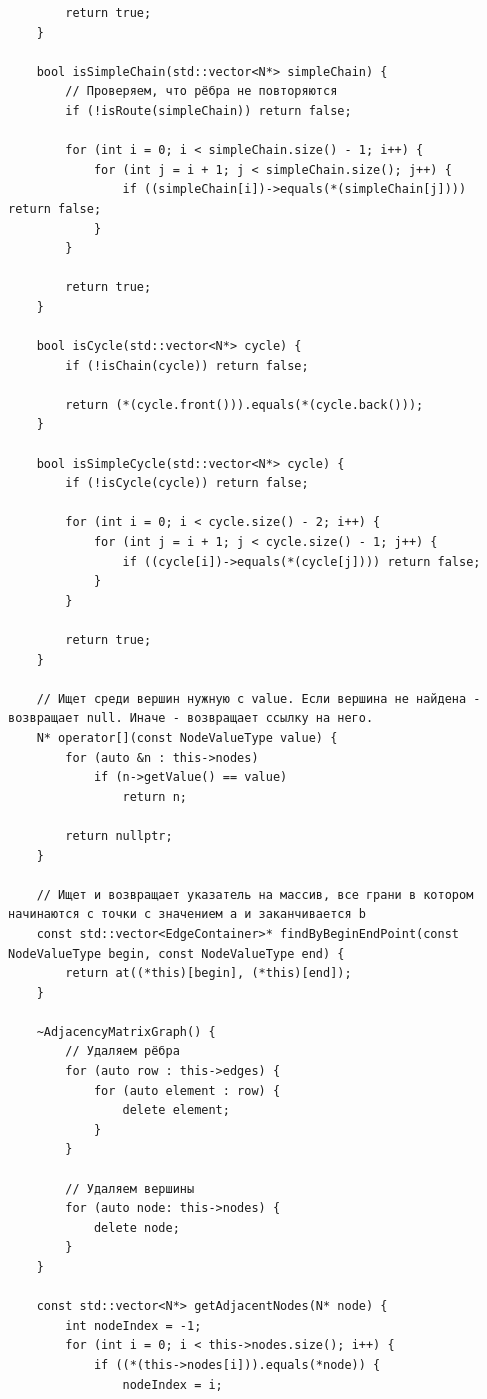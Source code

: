 \documentclass[a4paper,14pt]{extarticle}
\begin{document}
\begin{enumerate}[1.]
\begin{verbatim}
        return true;
    }

    bool isSimpleChain(std::vector<N*> simpleChain) {
        // Проверяем, что рёбра не повторяются
        if (!isRoute(simpleChain)) return false;

        for (int i = 0; i < simpleChain.size() - 1; i++) {
            for (int j = i + 1; j < simpleChain.size(); j++) {
                if ((simpleChain[i])->equals(*(simpleChain[j]))) return false;
            }
        }

        return true;
    }

    bool isCycle(std::vector<N*> cycle) {
        if (!isChain(cycle)) return false;

        return (*(cycle.front())).equals(*(cycle.back()));
    }

    bool isSimpleCycle(std::vector<N*> cycle) {
        if (!isCycle(cycle)) return false;

        for (int i = 0; i < cycle.size() - 2; i++) {
            for (int j = i + 1; j < cycle.size() - 1; j++) {
                if ((cycle[i])->equals(*(cycle[j]))) return false;
            }
        }

        return true;
    }

    // Ищет среди вершин нужную с value. Если вершина не найдена - возвращает null. Иначе - возвращает ссылку на него. 
    N* operator[](const NodeValueType value) {
        for (auto &n : this->nodes) 
            if (n->getValue() == value)
                return n;
        
        return nullptr;
    }

    // Ищет и возвращает указатель на массив, все грани в котором начинаются с точки с значением a и заканчивается b
    const std::vector<EdgeContainer>* findByBeginEndPoint(const NodeValueType begin, const NodeValueType end) {
        return at((*this)[begin], (*this)[end]);
    }

    ~AdjacencyMatrixGraph() {
        // Удаляем рёбра
        for (auto row : this->edges) {
            for (auto element : row) {
                delete element;
            }
        }

        // Удаляем вершины
        for (auto node: this->nodes) {
            delete node;
        }
    }

    const std::vector<N*> getAdjacentNodes(N* node) {
        int nodeIndex = -1;
        for (int i = 0; i < this->nodes.size(); i++) {
            if ((*(this->nodes[i])).equals(*node)) { 
                nodeIndex = i;
            

\end{verbatim}
\end{enumerate}
\end{document}
